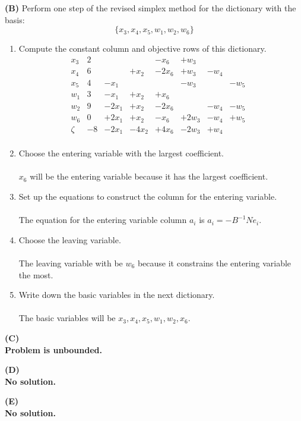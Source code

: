 \documentclass[11pt]{article}
\begin{document}
\noindent\textbf{(B)} Perform one step of the revised simplex method for the dictionary with the basis:
\[ \{x_3, x_4, x_5, w_1, w_2, w_6 \} \]

\begin{enumerate}
\item Compute the constant column and objective rows of this dictionary.
  \[\begin{array}{r|ccccccccccccc}
  x_3 & 2 & & & -x_6 & +w_3 & & & \\
  x_4 & 6 & & +x_2 & -2x_6 & +w_3 & -w_4 & \\
  x_5 & 4 & -x_1 & & & -w_3 & & -w_5 \\
  w_1 & 3 & -x_1 & +x_2 & +x_6 & & & \\
  w_2 & 9 & -2x_1 & +x_2 & -2x_6 & & -w_4 & -w_5 \\
  w_6 & 0 & +2x_1 & +x_2 & -x_6 & +2w_3 & -w_4 & +w_5 \\
  \hline
  \zeta & -8 & -2x_1 & -4x_2 & +4x_6 & -2w_3 & +w_4 & \\
  \end{array}\]
\item Choose the entering variable with the largest coefficient.\\
\\
$x_6$ will be the entering variable because it has the largest coefficient.
\item Set up the equations to construct the column for the entering
  variable.\\
  \\
  The equation for the entering variable column $a_i$ is $a_i = -B^{-1}Ne_i$.

\item Choose the leaving variable.\\
\\
The leaving variable with be $w_6$ because it constrains the entering variable the most.
\item Write down the basic variables in the next dictionary.\\
\\
The basic variables will be $x_3,x_4,x_5,w_1,w_2,x_6$.
\end{enumerate}

\noindent\textbf{(C)}
\\
\textbf{Problem is unbounded.}
\bigskip

\noindent\textbf{(D)}
\\
\textbf{No solution.}
\bigskip

\noindent\textbf{(E)} 
\\
\textbf{No solution.}
\bigskip

\end{document}
